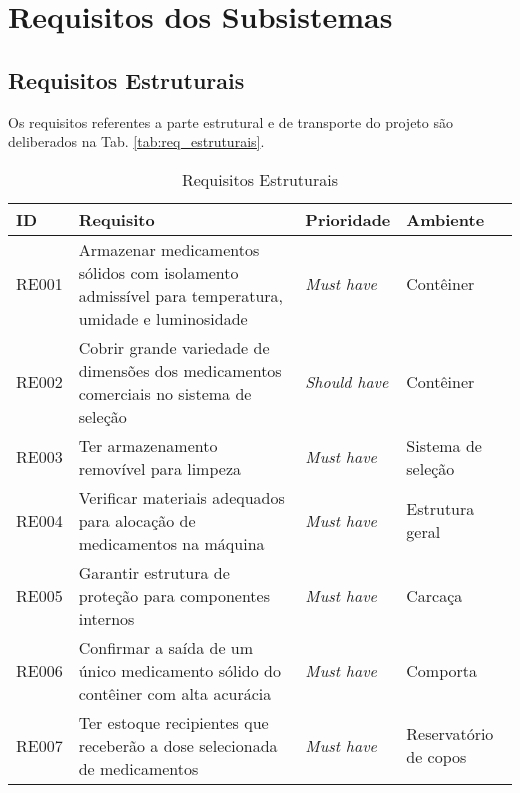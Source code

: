 \section{Requisitos dos Subsistemas}
\subsection{Requisitos Estruturais}

Os requisitos referentes a parte estrutural e de transporte do projeto são deliberados na Tab. \ref{tab:req_estruturais}.

\begin{table}[H]
        \centering
    \caption{Requisitos Estruturais}
	\begin{adjustbox}{max width = \textwidth}
        \begin{tabular}{|L{1.5cm}|L{8.5cm}|C{2.5cm}|C{3.5cm}|}
            \hline
            \textbf{ID} & \textbf{Requisito} & \textbf{Prioridade} & \textbf{Ambiente} \\
            \hline
            RE001 & Armazenar medicamentos sólidos com isolamento admissível para temperatura, umidade e luminosidade & \textit{Must have} & Contêiner\\ 
            \hline
            
            RE002 & Cobrir grande variedade de dimensões dos medicamentos comerciais no sistema de seleção & \textit{Should have} & Contêiner \\
            \hline
            
            RE003 & Ter armazenamento removível para limpeza & \textit{Must have} & Sistema de seleção\\
            \hline
            
            RE004 & Verificar materiais adequados para alocação de medicamentos na máquina & \textit{Must have} & Estrutura geral\\
            \hline
            
            RE005 &  Garantir estrutura de proteção para componentes internos & \textit{Must have} & Carcaça\\
            \hline
            
            RE006 & Confirmar a saída de um único medicamento sólido do contêiner com alta acurácia & \textit{Must have}  & Comporta\\ 
            \hline
            
            RE007 & Ter estoque recipientes que receberão a dose selecionada de medicamentos & \textit{Must have} & Reservatório de copos\\
            \hline
            

\end{tabular}
\end{adjustbox}
\end{table}
